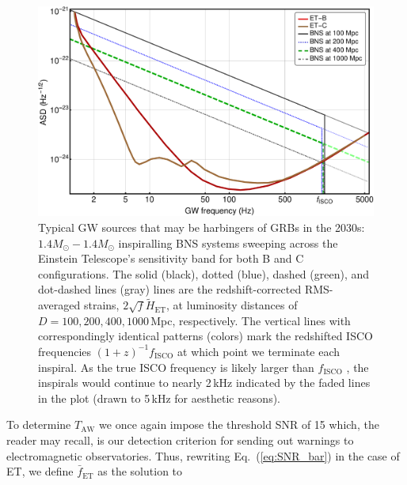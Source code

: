 \documentclass[prd,amsmath,amssymb,aps,floats,amsfonts,notitlepage,superscriptaddress,eqsecnum,nofootinbib,10pt]{revtex4-1}
\begin{document}
\begin{figure}[ht!]
\includegraphics[width=\linewidth]{../Figures/ET_strains_redshifted.pdf}
\caption{Typical GW sources that may be harbingers of GRBs in the 2030s: $1.4 M_\odot-1.4 M_\odot$ inspiralling BNS systems sweeping across 
the Einstein Telescope's sensitivity band for both B and C configurations.
The solid (black), dotted (blue), dashed (green), and dot-dashed lines (gray) lines are the redshift-corrected
RMS-averaged strains, $2\sqrt{f}\tilde{H}_\text{ET}$, at luminosity distances of $D=100, 200, 400, 1000\,$Mpc, respectively. 
The vertical lines with correspondingly identical patterns (colors) mark the redshifted ISCO frequencies $(1+z)^{-1} f_\text{ISCO}$ at which point we terminate each inspiral.
As the true ISCO frequency is likely larger than $f_\text{ISCO}$ \cite{Marronetti:2003hx}, the inspirals would continue to nearly 2\,kHz indicated by the 
faded lines in the plot (drawn to 5\,kHz for aesthetic reasons).
}
\label{fig:ETB2030}
\end{figure}
%
%
To determine $T_\text{AW}$ we once again impose the threshold SNR of 15 which, the reader may recall, 
is our detection criterion for sending out warnings to electromagnetic observatories. Thus, rewriting Eq.~(\ref{eq:SNR_bar}) in the case of ET, we define $\bar{f}_\text{ET}$ as the solution to
\end{document}
